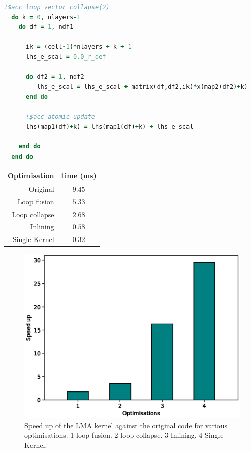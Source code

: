 \begin{lstlisting}[language=Fortran,caption={Optimised
    kernel},label={lst:LMA-opt}]
  !$acc loop vector collapse(2)
  do k = 0, nlayers-1
    do df = 1, ndf1

      ik = (cell-1)*nlayers + k + 1
      lhs_e_scal = 0.0_r_def

      do df2 = 1, ndf2
         lhs_e_scal = lhs_e_scal + matrix(df,df2,ik)*x(map2(df2)+k)
      end do
      
      !$acc atomic update
      lhs(map1(df)+k) = lhs(map1(df)+k) + lhs_e_scal

    end do
  end do
\end{lstlisting}

\begin{table}
\centering
\begin{tabular}{rc}
Optimisation & time (ms) \\\hline
Original     & $9.45$ \\
Loop fusion  & $5.33$ \\
Loop collapse & $2.68$ \\ 
Inlining      & $0.58$ \\
Single Kernel & $0.32$ \\\hline
\end{tabular}
\end{table}

\begin{figure}
\centering\includegraphics[width=1.0\linewidth]{figs/LMA-nvidia.eps}
\caption{\label{fig:lma_nvidia}Speed up of the LMA kernel against the
  original code for various optimisations. 1 loop fusion. 2 loop
  collapse. 3 Inlining. 4 Single Kernel.}
\end{figure} 



